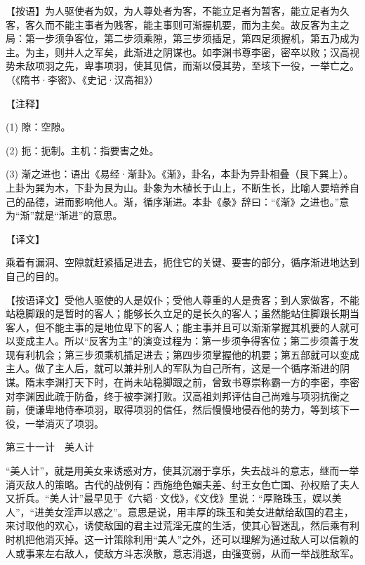 \documentclass[12pt,UTF8]{ctexbook}
\begin{document}
【按语】为人驱使者为奴，为人尊处者为客，不能立足者为暂客，能立足者为久客，客久而不能主事者为贱客，能主事则可渐握机要，而为主矣。故反客为主之局：第一步须争客位，第二步须乘隙，第三步须插足，第四足须握机，第五乃成为主。为主，则并人之军矣，此渐进之阴谋也。如李渊书尊李密，密卒以败；汉高视势未敌项羽之先，卑事项羽，使其见信，而渐以侵其势，至垓下一役，一举亡之。（《隋书·李密》、《史记·汉高祖》）





【注释】


(1) 隙：空隙。

(2) 扼：扼制。主机：指要害之处。

(3) 渐之进也：语出《易经·渐卦》。《渐》，卦名，本卦为异卦相叠（艮下巽上）。上卦为巽为木，下卦为艮为山。卦象为木植长于山上，不断生长，比喻人要培养自己的品德，进而影响他人。渐，循序渐进。本卦《彖》辞曰：“《渐》之进也。”意为“渐”就是“渐进”的意思。





【译文】


乘着有漏洞、空隙就赶紧插足进去，扼住它的关键、要害的部分，循序渐进地达到自己的目的。

【按语译文】受他人驱使的人是奴仆；受他人尊重的人是贵客；到人家做客，不能站稳脚跟的是暂时的客人；能够长久立足的是长久的客人；虽然能站住脚跟长期当客人，但不能主事的是地位卑下的客人；能主事并且可以渐渐掌握其机要的人就可以变成主人。所以“反客为主”的演变过程为：第一步须争得客位；第二步须善于发现有利机会；第三步须乘机插足进去；第四步须掌握他的机要；第五部就可以变成主人。做了主人后，就可以兼并别人的军队为自己所有，这是一个循序渐进的阴谋。隋末李渊打天下时，在尚未站稳脚跟之前，曾致书尊崇称霸一方的李密，李密对李渊因此疏于防备，终于被李渊打败。汉高祖刘邦评估自己尚难与项羽抗衡之前，便谦卑地侍奉项羽，取得项羽的信任，然后慢慢地侵吞他的势力，等到垓下一役，一举消灭了项羽。





第三十一计　美人计


“美人计”，就是用美女来诱惑对方，使其沉溺于享乐，失去战斗的意志，继而一举消灭敌人的策略。古代的战例有：西施绝色媚夫差、纣王女色亡国、孙权赔了夫人又折兵。“美人计”最早见于《六韬·文伐》，《文伐》里说：“厚赂珠玉，娱以美人”，“进美女淫声以惑之”。意思是说，用丰厚的珠玉和美女进献给敌国的君主，来讨取他的欢心，诱使敌国的君主过荒淫无度的生活，使其心智迷乱，然后乘有利时机把他消灭掉。这一计策除利用“美人”之外，还可以理解为通过敌人可以信赖的人或事来左右敌人，使敌方斗志涣散，意志消退，由强变弱，从而一举战胜敌军。
\end{document}
